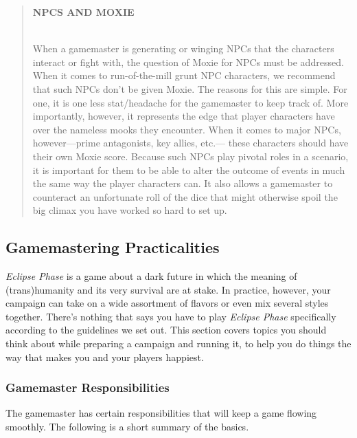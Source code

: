 \begin{quotation} \begin{large} \textbf{NPCS AND MOXIE} \end{large} \\ When a gamemaster is generating or winging NPCs that the characters interact or fight with, the question of Moxie for NPCs must be addressed. When it comes to run-of-the-mill grunt NPC characters, we recommend that such NPCs don’t be given Moxie. The reasons for this are simple. For one, it is one less stat/headache for the gamemaster to keep track of. More importantly, however, it represents the edge that player characters have over the nameless mooks they encounter. When it comes to major NPCs, however—prime antagonists, key allies, etc.— these characters should have their own Moxie score. Because such NPCs play pivotal roles in a scenario, it is important for them to be able to alter the outcome of events in much the same way the player characters can. It also allows a gamemaster to counteract an unfortunate roll of the dice that might otherwise spoil the big climax you have worked so hard to set up. \end{quotation} 

\subsection{Gamemastering Practicalities} 

\textit{Eclipse Phase} is a game about a dark future in which the meaning of (trans)humanity and its very survival are at stake. In practice, however, your campaign can take on a wide assortment of flavors or even mix several styles together. There's nothing that says you have to play \textit{Eclipse Phase} specifically according to the guidelines we set out. This section covers topics you should think about while preparing a campaign and running it, to help you do things the way that makes you and your players happiest. 

\subsubsection{Gamemaster Responsibilities } 

The gamemaster has certain responsibilities that will keep a game flowing smoothly. The following is a short summary of the basics. 

